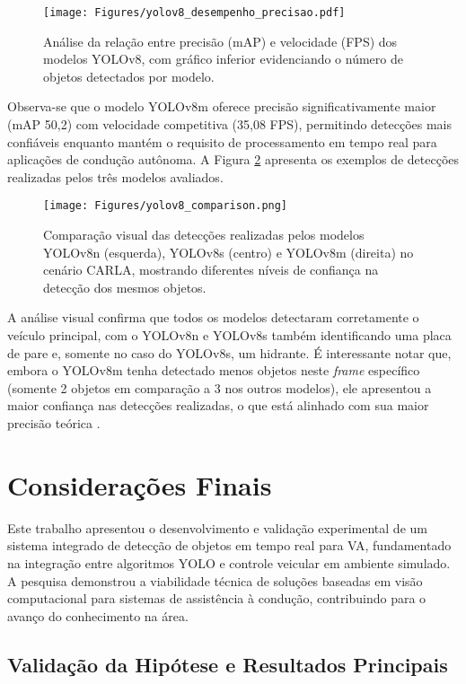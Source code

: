 \begin{figure}[H]
\centering
\texttt{[image: Figures/yolov8\_desempenho\_precisao.pdf]}
\caption{Análise da relação entre precisão (mAP) e velocidade (FPS) dos modelos YOLOv8, com gráfico inferior evidenciando o número de objetos detectados por modelo.}
\label{fig:yolov8_precision}
\end{figure}

Observa-se que o modelo YOLOv8m oferece precisão significativamente maior (mAP 50,2) com velocidade competitiva (35,08 FPS), permitindo detecções mais confiáveis enquanto mantém o requisito de processamento em tempo real para aplicações de condução autônoma. A Figura \ref{fig:yolov8_comparison} apresenta os exemplos de detecções realizadas pelos três modelos avaliados.

\begin{figure}[H]
\centering
\texttt{[image: Figures/yolov8\_comparison.png]}
\caption{Comparação visual das detecções realizadas pelos modelos YOLOv8n (esquerda), YOLOv8s (centro) e YOLOv8m (direita) no cenário CARLA, mostrando diferentes níveis de confiança na detecção dos mesmos objetos.}
\label{fig:yolov8_comparison}
\end{figure}

A análise visual confirma que todos os modelos detectaram corretamente o veículo principal, com o YOLOv8n e YOLOv8s também identificando uma placa de pare e, somente no caso do YOLOv8s, um hidrante. É interessante notar que, embora o YOLOv8m tenha detectado menos objetos neste \textit{frame} específico (somente 2 objetos em comparação a 3 nos outros modelos), ele apresentou a maior confiança nas detecções realizadas, o que está alinhado com sua maior precisão teórica \cite{wang_yolov1_to_yolov10}.

\chapter{Considerações Finais} \label{concl}

Este trabalho apresentou o desenvolvimento e validação experimental de um sistema integrado de detecção de objetos em tempo real para VA, fundamentado na integração entre algoritmos YOLO e controle veicular em ambiente simulado. A pesquisa demonstrou a viabilidade técnica de soluções baseadas em visão computacional para sistemas de assistência à condução, contribuindo para o avanço do conhecimento na área.

\section{Validação da Hipótese e Resultados Principais}

